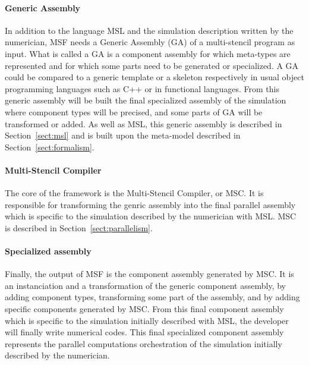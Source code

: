 \paragraph{\textbf{Generic Assembly}}
In addition to the language MSL and the simulation description written by the numerician, MSF needs a Generic Assembly (GA) of a multi-stencil program as input. What is called a GA is a component assembly for which meta-types are represented and for which some parts need to be generated or specialized. A GA could be compared to a generic template or a skeleton respectively in usual object programming languages such as C++ or in functional languages. From this generic assembly will be built the final specialized assembly of the simulation where component types will be precised, and some parts of GA will be transformed or added. As well as MSL, this generic assembly is described in Section~\ref{sect:msl} and is built upon the meta-model described in Section~\ref{sect:formalism}.

\paragraph{\textbf{Multi-Stencil Compiler}}
The core of the framework is the Multi-Stencil Compiler, or MSC. It is responsible for transforming the genric assembly into the final parallel assembly which is specific to the simulation described by the numerician with MSL. MSC is described in Section~\ref{sect:parallelism}.

\paragraph{\textbf{Specialized assembly}}
Finally, the output of MSF is the component assembly generated by MSC. It is an instanciation and a transformation of the generic component assembly, by adding component types, transforming some part of the assembly, and by adding specific components generated by MSC. From this final component assembly which is specific to the simulation initially described with MSL, the developer will finally write numerical codes. This final specialized component assembly represents the parallel computations orchestration of the simulation initially described by the numerician.
